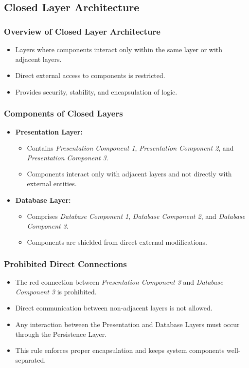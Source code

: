 \documentclass[aspectratio=169, table]{beamer}
\begin{document}
\subsection{Closed Layer Architecture}

\begin{frame}
	\frametitle{Overview of Closed Layer Architecture}
	\begin{itemize}
		\item Layers where components interact only within the same layer or with adjacent layers.
		\item Direct external access to components is restricted.
		\item Provides security, stability, and encapsulation of logic.
	\end{itemize}
\end{frame}

\begin{frame}
	\frametitle{Components of Closed Layers}
	\begin{itemize}
		\item \textbf{Presentation Layer:}
		\begin{itemize}
			\item Contains \textit{Presentation Component 1}, \textit{Presentation Component 2}, and \textit{Presentation Component 3}.
			\item Components interact only with adjacent layers and not directly with external entities.
		\end{itemize}
		\item \textbf{Database Layer:}
		\begin{itemize}
			\item Comprises \textit{Database Component 1}, \textit{Database Component 2}, and \textit{Database Component 3}.
			\item Components are shielded from direct external modifications.
		\end{itemize}
	\end{itemize}
\end{frame}

\begin{frame}
	\frametitle{Prohibited Direct Connections}
	\begin{itemize}
		\item The red connection between \textit{Presentation Component 3} and \textit{Database Component 3} is prohibited.
		\item Direct communication between non-adjacent layers is not allowed.
		\item Any interaction between the Presentation and Database Layers must occur through the Persistence Layer.
		\item This rule enforces proper encapsulation and keeps system components well-separated.
	\end{itemize}
\end{frame}
\end{document}
